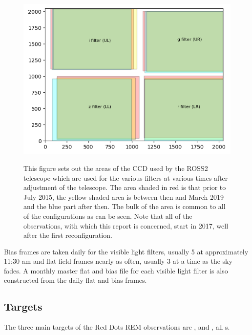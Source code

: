\begin{figure}[!htbp]
\begin{center}
\includegraphics[scale=1]{images/showusedccd.png} \\
\end{center}
\caption{This figure sets out the areas of the CCD used by the ROSS2
telescope which are used for the various filters at various times after
adjustment of the telescope. The area shaded in red is that prior to July 2015, the yellow shaded area is between
then and March 2019 and the blue part after then. The bulk of the area is
common to all of the configurations as can be seen. Note that all of the
{\rdwarf} observations, with which this report is concerned, start in 2017, well
after the first reconfiguration.} \protect\label{fig:showusedccd}
\end{figure}

Bias frames are taken daily for the visible light filters, usually 5 at
approximately 11:30 am and flat field frames nearly as often, usually 3 at a
time as the sky fades. A monthly master flat and bias file for each visible
light filter is also constructed from the daily flat and bias frames.

\subsection{Targets}
\protect\label{section:targets}

The three main targets of the Red Dots REM observations are \prox, {\bstar} and
\ross, all \rdwarf s.

